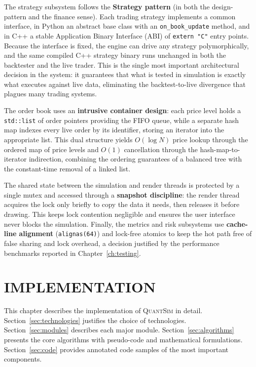 \documentclass[12pt,oneside,a4paper]{report}
\newcommand{\quantsim}{\textsc{QuantSim}}
\begin{document}
The strategy subsystem follows the \textbf{Strategy pattern} (in both the design-pattern and the finance sense). Each trading strategy implements a common interface, in Python an abstract base class with an \texttt{on\_book\_update} method, and in C++ a stable Application Binary Interface (ABI) of \texttt{extern "C"} entry points. Because the interface is fixed, the engine can drive any strategy polymorphically, and the same compiled C++ strategy binary runs unchanged in both the backtester and the live trader. This is the single most important architectural decision in the system: it guarantees that what is tested in simulation is exactly what executes against live data, eliminating the backtest-to-live divergence that plagues many trading systems.

The order book uses an \textbf{intrusive container design}: each price level holds a \texttt{std::list} of order pointers providing the FIFO queue, while a separate hash map indexes every live order by its identifier, storing an iterator into the appropriate list. This dual structure yields $O(\log N)$ price lookup through the ordered map of price levels and $O(1)$ cancellation through the hash-map-to-iterator indirection, combining the ordering guarantees of a balanced tree with the constant-time removal of a linked list.

The shared state between the simulation and render threads is protected by a single mutex and accessed through a \textbf{snapshot discipline}: the render thread acquires the lock only briefly to copy the data it needs, then releases it before drawing. This keeps lock contention negligible and ensures the user interface never blocks the simulation. Finally, the metrics and risk subsystems use \textbf{cache-line alignment} (\texttt{alignas(64)}) and lock-free atomics to keep the hot path free of false sharing and lock overhead, a decision justified by the performance benchmarks reported in Chapter~\ref{ch:testing}.

\chapter{IMPLEMENTATION}
\label{ch:implementation}

This chapter describes the implementation of \quantsim{} in detail. Section~\ref{sec:technologies} justifies the choice of technologies. Section~\ref{sec:modules} describes each major module. Section~\ref{sec:algorithms} presents the core algorithms with pseudo-code and mathematical formulations. Section~\ref{sec:code} provides annotated code samples of the most important components.
\end{document}
